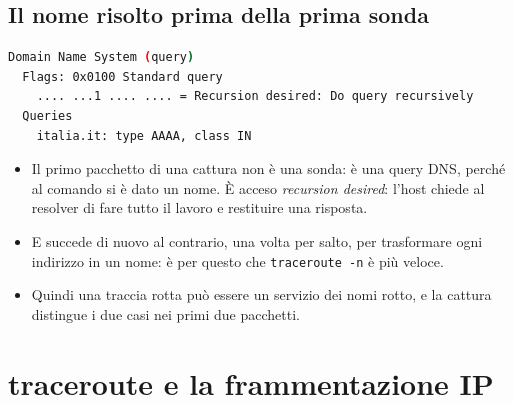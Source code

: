 
\subsection{Il nome risolto prima della prima sonda}

\begin{lstlisting}[language=bash, title={Il primo pacchetto della cattura, in Wireshark}]
Domain Name System (query)
  Flags: 0x0100 Standard query
    .... ...1 .... .... = Recursion desired: Do query recursively
  Queries
    italia.it: type AAAA, class IN
\end{lstlisting}

\begin{itemize}
    \item Il primo pacchetto di una cattura non è una sonda: è una query DNS, perché al comando si è dato un nome. È acceso
          \emph{recursion desired}: l'host chiede al resolver di fare tutto il lavoro e restituire una risposta.
    \item E succede di nuovo al contrario, una volta per salto, per trasformare ogni indirizzo in un nome: è per questo che
          \texttt{traceroute -n} è più veloce.
    \item Quindi una traccia rotta può essere un servizio dei nomi rotto, e la cattura distingue i due casi nei primi due
          pacchetti.
\end{itemize}

\section{traceroute e la frammentazione IP}

